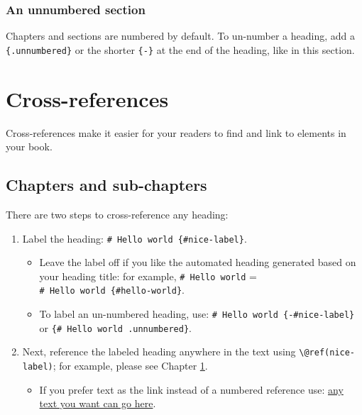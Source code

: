 \documentclass[
]{book}
\providecommand{\tightlist}{%
  \setlength{\itemsep}{0pt}\setlength{\parskip}{0pt}}
\theoremstyle{definition}
\theoremstyle{definition}
\theoremstyle{definition}
\theoremstyle{definition}
\theoremstyle{remark}
\begin{document}
\hypertarget{an-unnumbered-section}{%
\subsection*{An unnumbered section}\label{an-unnumbered-section}}

Chapters and sections are numbered by default. To un-number a heading, add a \texttt{\{.unnumbered\}} or the shorter \texttt{\{-\}} at the end of the heading, like in this section.

\hypertarget{cross}{%
\chapter{Cross-references}\label{cross}}

Cross-references make it easier for your readers to find and link to elements in your book.

\hypertarget{chapters-and-sub-chapters}{%
\section{Chapters and sub-chapters}\label{chapters-and-sub-chapters}}

There are two steps to cross-reference any heading:

\begin{enumerate}
\def\labelenumi{\arabic{enumi}.}
\tightlist
\item
  Label the heading: \texttt{\#\ Hello\ world\ \{\#nice-label\}}.

  \begin{itemize}
  \tightlist
  \item
    Leave the label off if you like the automated heading generated based on your heading title: for example, \texttt{\#\ Hello\ world} = \texttt{\#\ Hello\ world\ \{\#hello-world\}}.
  \item
    To label an un-numbered heading, use: \texttt{\#\ Hello\ world\ \{-\#nice-label\}} or \texttt{\{\#\ Hello\ world\ .unnumbered\}}.
  \end{itemize}
\item
  Next, reference the labeled heading anywhere in the text using \texttt{\textbackslash{}@ref(nice-label)}; for example, please see Chapter \ref{cross}.

  \begin{itemize}
  \tightlist
  \item
    If you prefer text as the link instead of a numbered reference use: \protect\hyperlink{cross}{any text you want can go here}.
  \end{itemize}
\end{enumerate}
\end{document}
